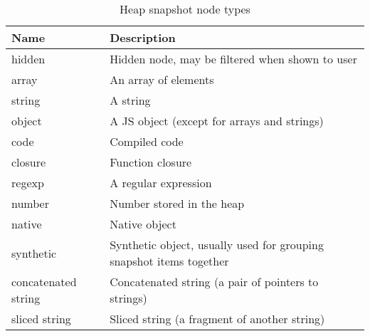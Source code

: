 \begin{table}[!htbp]
	\small
	\centering
	\begin{tabular}{|p{1.7cm}||p{5.5cm}|}
		\hline
		\textbf{Name} & \textbf{Description} 					\\ \hline \hline
		hidden & Hidden node, may be filtered when shown to user\\ \hline
		array  & An array of elements							\\ \hline
		string & A string										\\ \hline
		object & A JS object (except for arrays and strings)	\\ \hline
		code   & Compiled code									\\ \hline
		closure & Function closure								\\ \hline
		regexp & A regular expression							\\ \hline
		number & Number stored in the heap						\\ \hline
		native & Native object 									\\ \hline
		synthetic & Synthetic object, usually used for grouping 
					snapshot items together						\\ \hline
		{\footnotesize concatenated string} & Concatenated string 
							(a pair of pointers to strings)		\\ \hline
		sliced string & Sliced string 
						(a fragment of another string)			\\ \hline
	\end{tabular}
	\caption{Heap snapshot node types}
	\label{tap:heap_snapshot_node_types}
\end{table}

 
